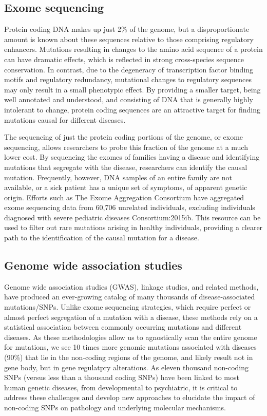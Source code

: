 \subsection{Exome sequencing}

Protein coding DNA makes up just 2\% of the genome, but a disproportionate amount is known about these sequences relative to those comprising regulatory enhancers. Mutations resulting in changes to the amino acid sequence of a protein can have dramatic effects, which is reflected in strong cross-species sequence conservation. In contrast, due to the degeneracy of transcription factor binding motifs and regulatory redundancy, mutational changes to regulatory sequences may only result in a small phenotypic effect. By providing a smaller target, being well annotated and understood, and consisting of DNA that is generally highly intolerant to change, protein coding sequences are an attractive target for finding mutations causal for different diseases.

The sequencing of just the protein coding portions of the genome, or exome sequencing, allows researchers to probe this fraction of the genome at a much lower cost. By sequencing the exomes of families having a disease and identifying mutations that segregate with the disease, researchers can identify the causal mutation. Frequently, however, DNA samples of an entire family are not available, or a sick patient has a unique set of symptoms, of apparent genetic origin. Efforts such as The Exome Aggregation Consortium have aggregated exome sequencing data from 60,706 unrelated individuals, excluding individuals diagnosed with severe pediatric diseases {Consortium:2015ib}. This resource can be used to filter out rare mutations arising in healthy individuals, providing a clearer path to the identification of the causal mutation for a disease.

\subsection{Genome wide association studies}

Genome wide association studies (GWAS), linkage studies, and related methods, have produced an ever-growing catalog of many thousands of disease-associated mutations/SNPs. Unlike exome sequencing strategies, which require perfect or almost perfect segregation of a mutation with a disease, these methods rely on a statistical association between commonly occurring mutations and different diseases. As these methodologies allow us to agnostically scan the entire genome for mutations, we see 10 times more genomic mutations associated with diseases (90\%) that lie in the non-coding regions of the genome, and likely result not in gene body, but in gene regulatpry alterations. As eleven thousand non-coding SNPs (versus less than a thousand coding SNPs) have been linked to most human genetic diseases, from developmental to psychiatric, it is critical to address these challenges and develop new approaches to elucidate the impact of non-coding SNPs on pathology and underlying molecular mechanisms.

